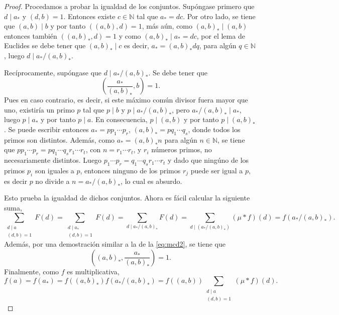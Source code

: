 \begin{proof}
Procedamos a probar la igualdad de los conjuntos. Supóngase primero que $d \mid a_*$ y $(d,b)=1$. Entonces existe $c \in \mathbb{N}$ tal que $a_*=d c$. Por otro lado, se tiene que $(a,b) \mid b$ y por tanto $((a,b),d)=1$, más aún, como $(a,b)_* \mid (a,b)$ entonces también $((a,b)_*,d)=1$ y como $(a,b)_* \mid a_* = d c$, por el lema de Euclides se debe tener que $(a,b)_* \mid c$ es decir, $a_* = (a,b)_* d q$, para algún $q \in \mathbb{N}$, luego $d \mid a_* / (a,b)_*$.
\bigskip

Recíprocamente, supóngase que $d \mid a_*/(a,b)_*$. Se debe tener que
\begin{equation}\label{eq:mcd2}
    \left( \frac{a_*}{(a,b)_*},b \right) = 1.
\end{equation}
Pues en caso contrario, es decir, si este máximo común divisor fuera mayor que uno, existiría un primo $p$ tal que $p \mid b$ y $p \mid a_*/(a,b)_*$, pero $a_*/(a,b)_* \mid a_*$, luego $p \mid a_*$ y por tanto $p \mid a$. En consecuencia, $p \mid (a,b)$ y por tanto $p \mid (a,b)_*$. Se puede escribir entonces $a_*=p p_1 \cdots p_r$, $(a,b)_*= p q_1 \cdots q_s$, donde todos los primos son distintos. Además, como $a_*=(a,b)_* n$ para algún $n \in \mathbb{N}$, se tiene que
$p p_1 \cdots p_r = p q_1 \cdots q_s r_1 \cdots r_t$, con $n=r_1 \cdots r_t$, y $r_i$ números primos, no necesariamente distintos. Luego $p_1 \cdots p_r = q_1 \cdots q_s r_1 \cdots r_t$ y dado que ningúno de los primos $p_i$ son iguales a $p$, entonces ninguno de los primos $r_j$ puede ser igual a $p$, es decir $p$ no divide a $n=a_*/(a,b)_*$, lo cual es absurdo.
\bigskip

Esto prueba la igualdad de dichos conjuntos. Ahora es fácil calcular la siguiente suma,
\begin{equation*}
    \sum_{\substack{d \mid a \\ (d,b)=1}} F(d) = \sum_{\substack{ d \mid a_* \\ (d,b)=1}} F(d) = \sum_{d \mid a_* / (a,b)_*} F(d) = \sum_{d \mid (a_*/(a,b)_*)} (\mu * f)(d) = f(a_*/(a,b)_*).
\end{equation*}
Además, por una demostración similar a la de la \cref{eq:mcd2}, se tiene que
\begin{equation*}
    \left( (a,b)_*,\frac{a_*}{(a,b)_*} \right) = 1.
\end{equation*}
Finalmente, como $f$ es multiplicativa,
\begin{equation*}
    f(a) = f(a_*) = f((a,b)_*)f(a_*/(a,b)_*) = f((a,b)) \sum_{\substack{d \mid a \\ (d,b)=1}} (\mu * f)(d).
\end{equation*}
\end{proof}

